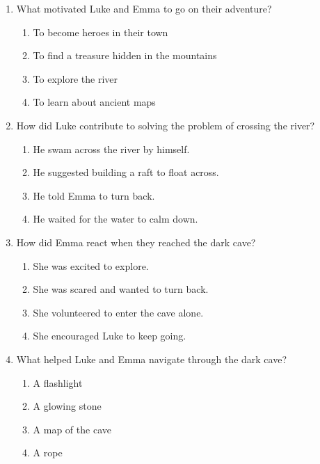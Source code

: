 \documentclass[12pt]{article}
\begin{document}
\begin{enumerate}

\item What motivated Luke and Emma to go on their adventure?

\begin{enumerate}[label=\Alph*.]
    \item To become heroes in their town
    \item To find a treasure hidden in the mountains
    \item To explore the river
    \item To learn about ancient maps
\end{enumerate}

\vspace{0.5cm}

\item How did Luke contribute to solving the problem of crossing the river?

\begin{enumerate}[label=\Alph*.]
    \item He swam across the river by himself.
    \item He suggested building a raft to float across.
    \item He told Emma to turn back.
    \item He waited for the water to calm down.
\end{enumerate}

\vspace{0.5cm}

\item How did Emma react when they reached the dark cave?

\begin{enumerate}[label=\Alph*.]
    \item She was excited to explore.
    \item She was scared and wanted to turn back.
    \item She volunteered to enter the cave alone.
    \item She encouraged Luke to keep going.
\end{enumerate}

\vspace{0.5cm}

\item What helped Luke and Emma navigate through the dark cave?

\begin{enumerate}[label=\Alph*.]
    \item A flashlight
    \item A glowing stone
    \item A map of the cave
    \item A rope
\end{enumerate}


\end{enumerate}
\end{document}
